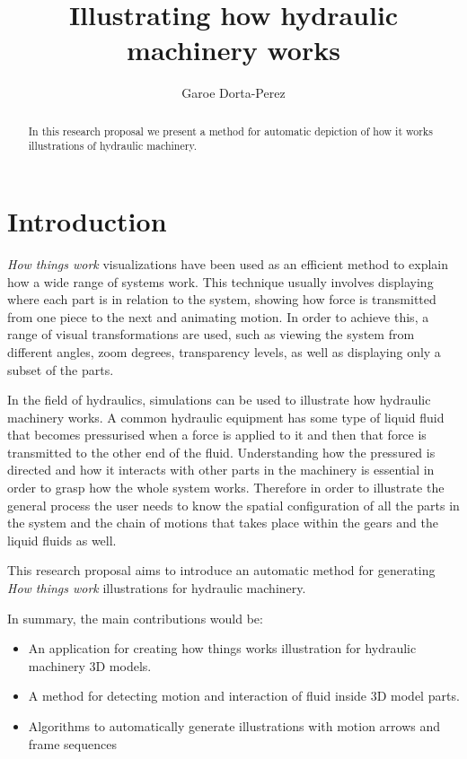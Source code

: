 \documentclass[11pt]{report}
\title{ Illustrating how hydraulic machinery works } \author{Garoe Dorta-Perez}
\begin{document}
\maketitle
\begin{abstract}
In this research proposal we present a method for automatic depiction of how it works illustrations of hydraulic machinery. \end{abstract}


\chapter{Introduction}
\label{ch:intro}

\textit{How things work} visualizations have been used as an efficient method to explain
how a wide range of systems work. This technique usually involves displaying where each
part is in relation to the system, showing how force is transmitted from one piece
to the next and animating motion. In order to achieve this, a range of visual
transformations are used, such as viewing the system from different angles, zoom degrees, 
transparency levels, as well as displaying only a subset of the parts.

In the field of hydraulics, simulations can be used to illustrate how hydraulic machinery works.
A common hydraulic equipment has 
some type of liquid fluid that becomes pressurised when a force is applied to it and then
that force is transmitted to the other end of the fluid. Understanding how the pressured is
directed and how it interacts with other parts in the machinery is essential in order
to grasp how the whole system works. Therefore in order to illustrate the general 
process the user needs to know the spatial configuration of all the parts in the
system and the chain of motions that takes place within the gears and the liquid fluids
as well.

This research proposal aims to introduce an automatic method for generating
\textit{How things work} illustrations for hydraulic machinery. 

In summary, the main contributions would be:
\begin{itemize}
\item An application for creating how things works illustration for hydraulic machinery 3D models.
\item A method for detecting motion and interaction of fluid inside 3D model parts.
\item Algorithms to automatically generate illustrations with motion arrows and frame sequences
\end{itemize}
\end{document}
